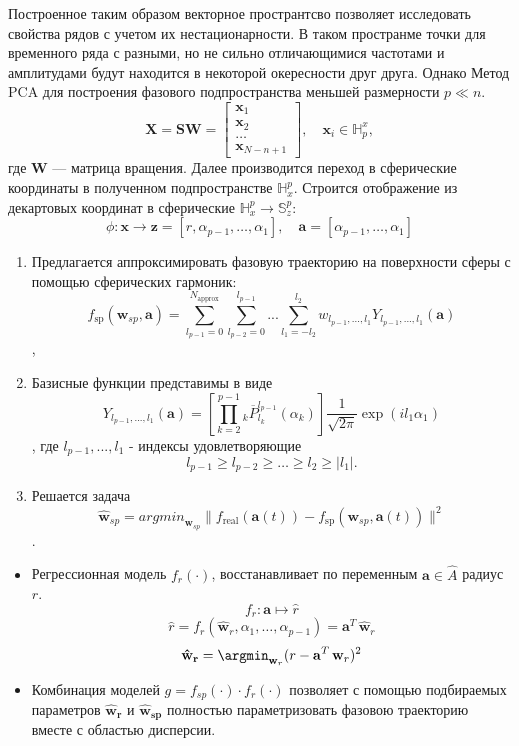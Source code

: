 Построенное таким образом векторное пространтсво позволяет исследовать свойства рядов с учетом их нестационарности. В таком пространме точки для временного ряда с разными, но не сильно отличающимися частотами и амплитудами будут находится в некоторой окересности друг друга.
Однако Метод PCA для построения фазового подпространства меньшей размерности $p \ll n$.
\[\mathbf{X} = \mathbf{S W} =
    \begin{bmatrix}
        \mathbf{x}_1 \\
        \mathbf{x}_2  \\
        \dots \\
        \mathbf{x}_{N-n+1}
    \end{bmatrix},
    \quad
    \mathbf{x}_{i} \in \mathbb{H}_{p}^{x},\]
    где $\mathbf{W}$ --- матрица вращения.
Далее производится переход в сферические координаты в полученном подпространстве $\mathbb{H}_{x}^{p}$.
Строится отображение из декартовых координат в сферические $\mathbb{H}_{x}^{p} \xrightarrow{} \mathbb{S}_{z}^{p}$:
\[
    \phi: \mathbf{x} \xrightarrow{} \mathbf{z} = [r,\alpha_{p-1},\dots,\alpha_1],
    \quad
    \mathbf{a} = [\alpha_{p-1},\dots,\alpha_1]
\]

\begin{enumerate}
    \item Предлагается аппроксимировать фазовую траекторию на поверхности сферы с помощью сферических гармоник:
        \[f_{\text{sp}}(\mathbf{w}_{sp},\mathbf{a}) = \sum_{l_{p-1} = 0}^{N_{\text{approx}}}\sum_{l_{p-2} = 0}^{l_{p-1}}...\sum_{l_1 = -l_2}^{l_2}
        w_{l_{p-1},...,l_1} Y_{l_{p-1},...,l_1}(\mathbf{a})\],
    
    \item Базисные функции представимы в виде     \[Y_{l_{p-1},...,l_1}(\mathbf{a}) = 
        \left[\prod\limits_{k = 2}^{p-1}{_k}{\overline{P}}_{l_k}^{l_{p-1}}(\alpha_k)\right]
        \frac{1}{\sqrt{2\pi}}
        \exp{(i l_1 \alpha_1)}\],
        где $l_{p-1},...,l_1$ - индексы удовлетворяющие
        \[l_{p-1} \geq l_{p-2} \geq \dots \geq l_2 \geq|l_1|.\]
    
    \item Решается задача 
        \[\mathbf{\hat{w}}_{sp} = {argmin}_{\mathbf{w}_{sp}}
        \|f_{\text{real}}(\mathbf{a}(t)) - f_{\text{sp}}(\mathbf{w}_{sp},\mathbf{a}(t))\|^2\].
\end{enumerate}

\begin{itemize}
\item Регрессионная модель $f_r(\cdot)$, восстанавливает по переменным $\mathbf{a} \in \hat{A}$ радиус $r$.
\[
    f_r: \mathbf{a}
    \mapsto
    \hat{r}
\]
\[
\hat{r} = f_r(\mathbf{\hat{w}}_r,\alpha_{1},\dots, \alpha_{p-1}) = \mathbf{a}^T\,\mathbf{\hat{w}}_r
\]
\[
\mathbf{\hat{w}_r} = \argmin_{\mathbf{w}_r}(r - \mathbf{a}^T\,\mathbf{w}_r)^2
\]

\item Комбинация моделей  $ g = f_{sp}(\cdot)\cdot f_r(\cdot)$ позволяет с помощью подбираемых параметров $\mathbf{\hat{w}_r}$ и $\mathbf{\hat{w}_{sp}}$ полностью параметризовать фазовою траекторию вместе с областью дисперсии.
\end{itemize}
